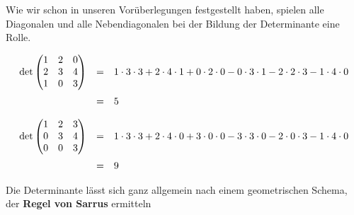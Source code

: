
\begin{notiz} Wie wir schon in unseren Vorüberlegungen festgestellt haben, spielen alle Diagonalen und alle
Nebendiagonalen bei der Bildung der Determinante eine Rolle. 
\end{notiz}

\begin{beispiel}
	$$ \begin{array} {l c l}
  	\det{ \begin{matrix} 1 & 2 & 0 \\ 2 & 3 & 4 \\ 1 & 0 & 3 \end{matrix} } & = &
   	1 \cdot 3 \cdot 3 + 2 \cdot 4 \cdot 1 + 0 \cdot 2 \cdot 0  - 0 \cdot 3 \cdot 1 - 2 \cdot 2 \cdot 3 
  	- 1 \cdot 4 \cdot 0 \\
  	& = & 5
   	\end{array} $$
\end{beispiel}

\begin{beispiel}
	$$ \begin{array} {l c l}
  	\det{ \begin{matrix} 1 & 2 & 3 \\ 0 & 3 & 4 \\ 0 & 0 & 3 \end{matrix} } & = &
   	1 \cdot 3 \cdot 3 + 2 \cdot 4 \cdot 0 + 3 \cdot 0 \cdot 0  - 3 \cdot 3 \cdot 0 - 2 \cdot 0 \cdot 3 
  	- 1 \cdot 4 \cdot 0 \\
  	& = & 9
   	\end{array} $$
\end{beispiel}

Die Determinante lässt sich ganz allgemein nach einem geometrischen Schema, der 
\textbf{Regel von Sarrus} ermitteln

